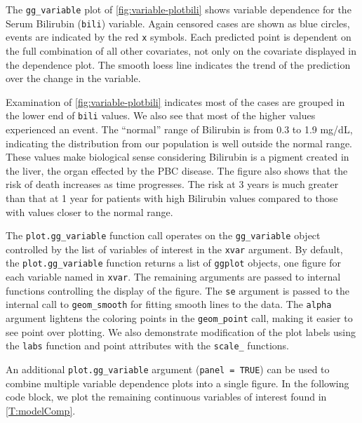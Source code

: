 \documentclass[article]{jss}
\begin{document}
The \texttt{gg\_variable} plot of \autoref{fig:variable-plotbili} shows
variable dependence for the Serum Bilirubin (\texttt{bili}) variable.
Again censored cases are shown as blue circles, events are indicated by
the red \texttt{x} symbols. Each predicted point is dependent on the
full combination of all other covariates, not only on the covariate
displayed in the dependence plot. The smooth loess line
\citep{cleveland:1981, cleveland:1988} indicates the trend of the
prediction over the change in the variable.

Examination of \autoref{fig:variable-plotbili} indicates most of the
cases are grouped in the lower end of \texttt{bili} values. We also see
that most of the higher values experienced an event. The ``normal''
range of Bilirubin is from 0.3 to 1.9 mg/dL, indicating the distribution
from our population is well outside the normal range. These values make
biological sense considering Bilirubin is a pigment created in the
liver, the organ effected by the PBC disease. The figure also shows that
the risk of death increases as time progresses. The risk at 3 years is
much greater than that at 1 year for patients with high Bilirubin values
compared to those with values closer to the normal range.

The \texttt{plot.gg\_variable} function call operates on the
\texttt{gg\_variable} object controlled by the list of variables of
interest in the \texttt{xvar} argument. By default, the
\texttt{plot.gg\_variable} function returns a list of \texttt{ggplot}
objects, one figure for each variable named in \texttt{xvar}. The
remaining arguments are passed to internal  functions
controlling the display of the figure. The \texttt{se} argument is
passed to the internal call to \texttt{geom\_smooth} for fitting smooth
lines to the data. The \texttt{alpha} argument lightens the coloring
points in the \texttt{geom\_point} call, making it easier to see point
over plotting. We also demonstrate modification of the plot labels using
the \texttt{labs} function and point attributes with the
\texttt{scale\_} functions.

An additional \texttt{plot.gg\_variable} argument
(\texttt{panel\ =\ TRUE}) can be used to combine multiple variable
dependence plots into a single figure. In the following code block, we
plot the remaining continuous variables of interest found in
\autoref{T:modelComp}.
\end{document}
